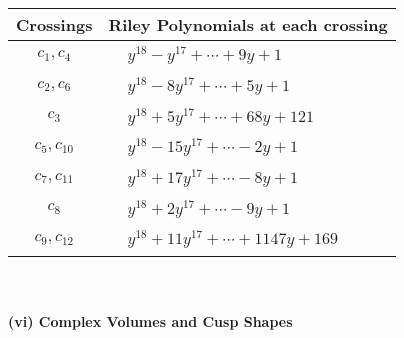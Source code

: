 \documentclass[1p]{elsarticle_modified}
\theoremstyle{definition}
\begin{document}
\begin{tabular}{m{50pt}|m{274pt}}
Crossings & \hspace{64pt}Riley Polynomials at each crossing \\
\hline $$\begin{aligned}c_{1},c_{4}\end{aligned}$$&$\begin{aligned}
&y^{18}- y^{17}+\cdots+9 y+1
\end{aligned}$\\
\hline $$\begin{aligned}c_{2},c_{6}\end{aligned}$$&$\begin{aligned}
&y^{18}-8 y^{17}+\cdots+5 y+1
\end{aligned}$\\
\hline $$\begin{aligned}c_{3}\end{aligned}$$&$\begin{aligned}
&y^{18}+5 y^{17}+\cdots+68 y+121
\end{aligned}$\\
\hline $$\begin{aligned}c_{5},c_{10}\end{aligned}$$&$\begin{aligned}
&y^{18}-15 y^{17}+\cdots-2 y+1
\end{aligned}$\\
\hline $$\begin{aligned}c_{7},c_{11}\end{aligned}$$&$\begin{aligned}
&y^{18}+17 y^{17}+\cdots-8 y+1
\end{aligned}$\\
\hline $$\begin{aligned}c_{8}\end{aligned}$$&$\begin{aligned}
&y^{18}+2 y^{17}+\cdots-9 y+1
\end{aligned}$\\
\hline $$\begin{aligned}c_{9},c_{12}\end{aligned}$$&$\begin{aligned}
&y^{18}+11 y^{17}+\cdots+1147 y+169
\end{aligned}$\\
\hline
\end{tabular}\\~\\
\newpage\flushleft \textbf{(vi) Complex Volumes and Cusp Shapes}
\end{document}
